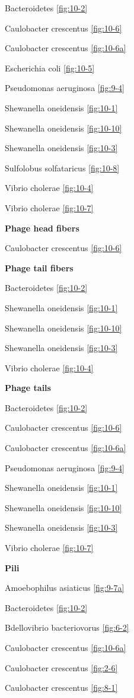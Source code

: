 \documentclass[]{tufte-book}
\begin{document}
Bacteroidetes \ref{fig:10-2}

Caulobacter crescentus \ref{fig:10-6}

Caulobacter crescentus \ref{fig:10-6a}

Escherichia coli \ref{fig:10-5}

Pseudomonas aeruginosa \ref{fig:9-4}

Shewanella oneidensis \ref{fig:10-1}

Shewanella oneidensis \ref{fig:10-10}

Shewanella oneidensis \ref{fig:10-3}

Sulfolobus solfataricus \ref{fig:10-8}

Vibrio cholerae \ref{fig:10-4}

Vibrio cholerae \ref{fig:10-7}

\textbf{Phage head fibers}

Caulobacter crescentus \ref{fig:10-6}

\textbf{Phage tail fibers}

Bacteroidetes \ref{fig:10-2}

Shewanella oneidensis \ref{fig:10-1}

Shewanella oneidensis \ref{fig:10-10}

Shewanella oneidensis \ref{fig:10-3}

Vibrio cholerae \ref{fig:10-4}

\textbf{Phage tails}

Bacteroidetes \ref{fig:10-2}

Caulobacter crescentus \ref{fig:10-6}

Caulobacter crescentus \ref{fig:10-6a}

Pseudomonas aeruginosa \ref{fig:9-4}

Shewanella oneidensis \ref{fig:10-1}

Shewanella oneidensis \ref{fig:10-10}

Shewanella oneidensis \ref{fig:10-3}

Vibrio cholerae \ref{fig:10-7}

\textbf{Pili}

Amoebophilus asiaticus \ref{fig:9-7a}

Bacteroidetes \ref{fig:10-2}

Bdellovibrio bacteriovorus \ref{fig:6-2}

Caulobacter crescentus \ref{fig:10-6a}

Caulobacter crescentus \ref{fig:2-6}

Caulobacter crescentus \ref{fig:8-1}
\end{document}
